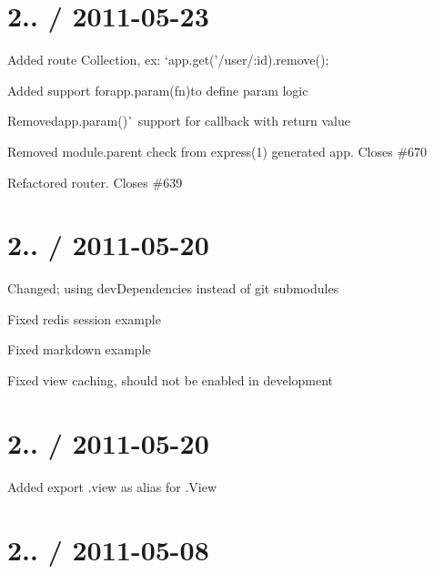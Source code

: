 {\ttfamily \section*{2.. / 2011-\/05-\/23 }}

{\ttfamily }

{\ttfamily 
\begin{DoxyItemize}
\item Added route {\ttfamily Collection}, ex\+: `app.\+get('/user/\+:id\textquotesingle{}).remove();{\ttfamily }
\item {\ttfamily Added support for}app.\+param(fn){\ttfamily to define param logic}
\item {\ttfamily Removed}app.\+param()\`{} support for callback with return value
\item Removed module.\+parent check from express(1) generated app. Closes \#670
\item Refactored router. Closes \#639
\end{DoxyItemize}}

{\ttfamily \section*{2.. / 2011-\/05-\/20 }}

{\ttfamily }

{\ttfamily 
\begin{DoxyItemize}
\item Changed; using dev\+Dependencies instead of git submodules
\item Fixed redis session example
\item Fixed markdown example
\item Fixed view caching, should not be enabled in development
\end{DoxyItemize}}

{\ttfamily \section*{2.. / 2011-\/05-\/20 }}

{\ttfamily }

{\ttfamily 
\begin{DoxyItemize}
\item Added export {\ttfamily .view} as alias for {\ttfamily .View}
\end{DoxyItemize}}

{\ttfamily \section*{2.. / 2011-\/05-\/08 }}

